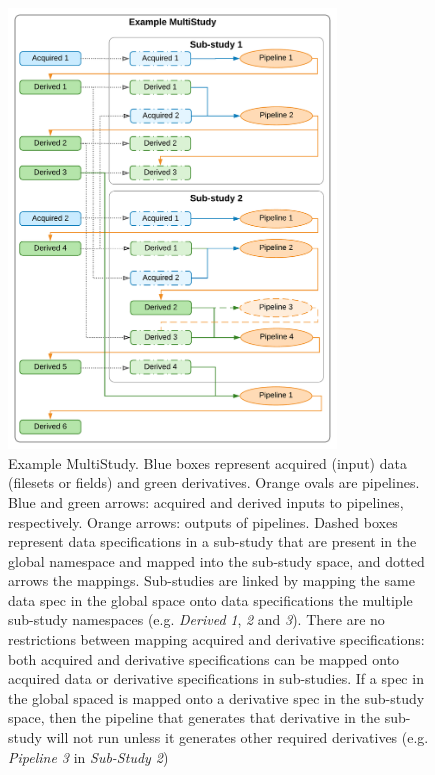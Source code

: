 \documentclass[smallextended]{svjour3}       %
\begin{document}
\begin{figure}
  \centering
    \includegraphics[width=0.775\textwidth]{../figures/example_multi_study}
  \caption{Example MultiStudy. Blue boxes represent acquired
(input) data (filesets or fields) and green derivatives. Orange ovals
are pipelines. Blue and green arrows: acquired and derived inputs to
pipelines, respectively. Orange arrows: outputs of pipelines. Dashed
boxes represent data specifications in a sub-study that are present in
the global namespace and mapped into the sub-study space, and dotted
arrows the mappings. Sub-studies are linked by mapping the same data
spec in the global space onto data specifications the multiple sub-study
namespaces (e.g. \emph{Derived} \emph{1}, \emph{2} and \emph{3}).
There are no restrictions
between mapping acquired and derivative specifications: both acquired
and derivative specifications can be mapped onto acquired data or
derivative specifications in sub-studies. If a spec in the global spaced
is mapped onto a derivative spec in the sub-study space, then the
pipeline that generates that derivative in the sub-study will not run
unless it generates other required derivatives (e.g. \emph{Pipeline 3} in
\emph{Sub-Study 2})}
\label{fig:example_multi_study}
\end{figure}
\end{document}
